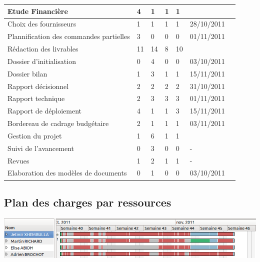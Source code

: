 \begin{tabular}{|l|l|l|l|l|l|c|}
\rowcolor{Activite} Etude Financière & 4 & 1 & 1 & 1 & \\ \hline
Choix des fournisseurs & 1 & 1 & 1 & 1 & 28/10/2011 \\ \hline
Plannification des commandes partielles & 3 & 0 & 0 & 0 & 01/11/2011 \\ \hline

\rowcolor{Activite} Rédaction des livrables & 11 & 14 & 8 & 10 & \\ \hline
Dossier d'initialisation & 0 & 4 & 0 & 0 & 03/10/2011 \\ \hline
Dossier bilan & 1 & 3 & 1 & 1 & 15/11/2011 \\ \hline
Rapport décisionnel & 2 & 2 & 2 & 2 & 31/10/2011 \\ \hline
Rapport technique & 2 & 3 & 3 & 3 & 01/11/2011 \\ \hline
Rapport de déploiement & 4 & 1 & 1 & 3 & 15/11/2011 \\ \hline
Bordereau de cadrage budgétaire & 2 & 1 & 1 & 1 & 03/11/2011 \\ \hline

\rowcolor{Activite} Gestion du projet & 1 & 6 & 1 & 1 & \\ \hline
Suivi de l'avancement & 0 & 3 & 0 & 0 & - \\ \hline
Revues & 1 & 2 & 1 & 1 & - \\ \hline
Elaboration des modèles de documents & 0 & 1 & 0 & 0 & 03/10/2011 \\ \hline

\end{tabular}

\subsection{Plan des charges par ressources}
\includegraphics[scale=0.9]{Ressources.png}

